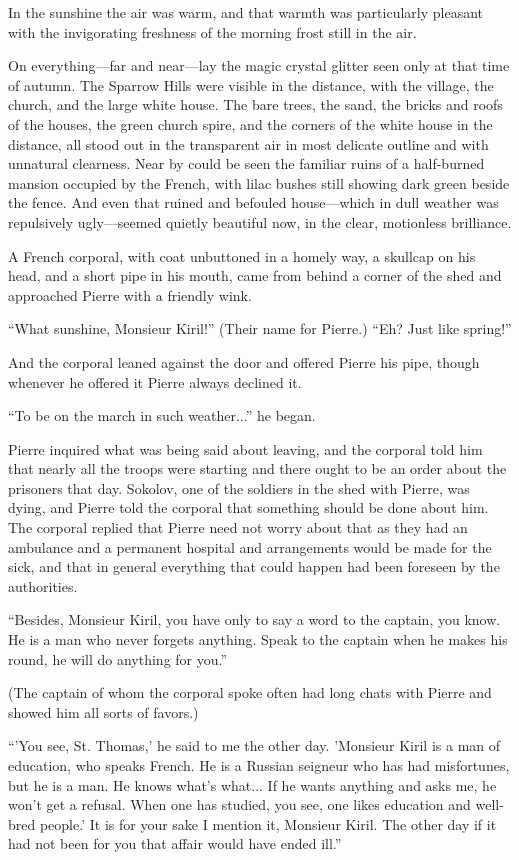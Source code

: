 In the sunshine the air was warm, and that warmth was
particularly pleasant with the invigorating freshness of the
morning frost still in the air.

On everything---far and near---lay the magic crystal glitter seen
only at that time of autumn. The Sparrow Hills were visible in
the distance, with the village, the church, and the large white
house. The bare trees, the sand, the bricks and roofs of the
houses, the green church spire, and the corners of the white
house in the distance, all stood out in the transparent air in
most delicate outline and with unnatural clearness.  Near by
could be seen the familiar ruins of a half-burned mansion
occupied by the French, with lilac bushes still showing dark
green beside the fence. And even that ruined and befouled
house---which in dull weather was repulsively ugly---seemed
quietly beautiful now, in the clear, motionless brilliance.

A French corporal, with coat unbuttoned in a homely way, a
skullcap on his head, and a short pipe in his mouth, came from
behind a corner of the shed and approached Pierre with a friendly
wink.

``What sunshine, Monsieur Kiril!'' (Their name for Pierre.) ``Eh?
Just like spring!''

And the corporal leaned against the door and offered Pierre his
pipe, though whenever he offered it Pierre always declined it.

``To be on the march in such weather...'' he began.

Pierre inquired what was being said about leaving, and the
corporal told him that nearly all the troops were starting and
there ought to be an order about the prisoners that day. Sokolov,
one of the soldiers in the shed with Pierre, was dying, and
Pierre told the corporal that something should be done about
him. The corporal replied that Pierre need not worry about that
as they had an ambulance and a permanent hospital and
arrangements would be made for the sick, and that in general
everything that could happen had been foreseen by the
authorities.

``Besides, Monsieur Kiril, you have only to say a word to the
captain, you know. He is a man who never forgets anything. Speak
to the captain when he makes his round, he will do anything for
you.''

(The captain of whom the corporal spoke often had long chats with
Pierre and showed him all sorts of favors.)

``'You see, St. Thomas,' he said to me the other day. 'Monsieur
Kiril is a man of education, who speaks French. He is a Russian
seigneur who has had misfortunes, but he is a man. He knows
what's what... If he wants anything and asks me, he won't get a
refusal. When one has studied, you see, one likes education and
well-bred people.' It is for your sake I mention it, Monsieur
Kiril. The other day if it had not been for you that affair would
have ended ill.''

